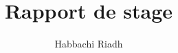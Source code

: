 \documentclass[a4paper,12pt]{scrreprt}
\title{Rapport de stage}
\author{Habbachi Riadh}
\begin{document}
\maketitle

\begin{abstract}
\end{abstract}
\end{document}
